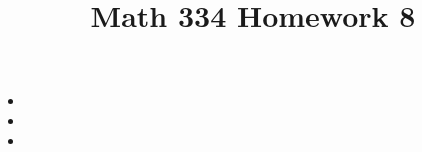 \documentclass{article}
\title{Math 334 Homework 8}
\begin{document}
\maketitle
\begin{itemize}[label=]
	\item 
	\item 
	\item 
\end{itemize}
\end{document}
